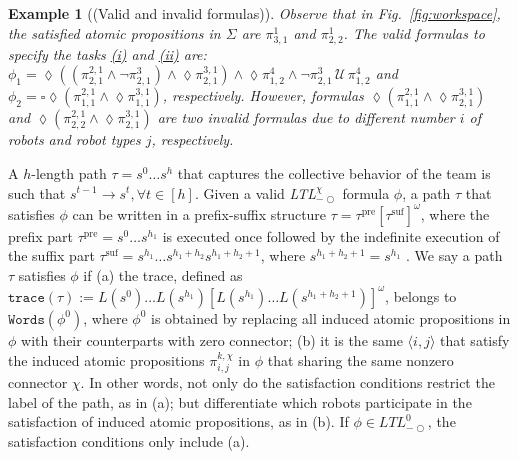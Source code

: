 \documentclass[Afour,sageh,times]{sagej}
\newtheorem{exmp}{Example}
\newcommand{\ltlx}{ {\it LTL}$_{-\bigcirc}^\chi$ }
\newcommand{\ag}[2]{\langle#1,#2\rangle}
\renewcommand{\ap}[3]{\mathcal{\pi}_{{#1},{#2}}^{#3}}
\newenvironment{cexmp}
{\addtocounter{exmp}{-1}\begin{exmp}}
  {\end{exmp}}
\begin{document}
 \begin{cexmp} [(Valid and invalid formulas)]
Observe that in Fig.~\ref{fig:workspace}, the satisfied atomic propositions in $\Sigma$ are $\ap{3}{1}{1}$ and $\ap{2}{2}{1}$.   The valid formulas to specify the tasks \hyperref[task:i]{\it (i)} and \hyperref[task:ii]{\it (ii)} are: $\phi_1 = \lozenge \left(\left(\ap{2}{1}{2,1}\wedge \neg \ap{2}{1}{3}\right) \wedge  \lozenge \ap{2}{1}{3,1}\right)  \wedge \lozenge \ap{1}{2}{4} \wedge \neg \ap{2}{1}{3} \,\mathcal{U}\, \ap{1}{2}{4}$ and $ \phi_2 = \square \lozenge \left(\ap{1}{1}{2,1} \wedge \lozenge \ap{1}{1}{3,1}\right)$, respectively. However, formulas $\lozenge \left(\ap{1}{1}{2,1} \wedge \lozenge \ap{2}{1}{3,1}\right)$ and $\lozenge \left(\ap{2}{2}{2,1} \wedge \lozenge \ap{2}{1}{3,1}\right)$ are two invalid formulas due to different number $i$ of robots and robot types $j$, respectively.
 \end{cexmp}
A $h$-length path $\tau = s^0 \ldots s^h$ that captures the collective behavior of the team is such that $s^{t-1}\to s^{t}, \forall t\in[h]$. Given a valid\ltlx formula $\phi$, a  path $\tau$ that satisfies $\phi$ can be written in a prefix-suffix structure $\tau=\tau^{\text{pre}}[\tau^{\text{suf}}]^\omega$, where the prefix part  $\tau^{\text{pre}}=s^0 \dots s^{h_1}$ is executed once followed by the indefinite execution of the suffix part $\tau^{\text{suf}}=s^{h_1} \dots s^{h_1+h_2} s^{h_1+h_2+1}$, where $s^{h_1+h_2+1}=s^{h_1}$ \citep{baier2008principles}. We say a path $\tau$ satisfies $\phi$ if (a) the trace, defined as $\texttt{trace}(\tau):=L(s^0)\dots L(s^{h_1})[L(s^{h_1})\dots L(s^{h_1+h_2+1})]^{\omega}$,  belongs to $\texttt{Words}(\phi^0)$, where $\phi^0$ is obtained by replacing all induced atomic propositions in $\phi$ with their counterparts with zero connector; (b) it is the same $\ag{i}{j}$ that satisfy the induced atomic propositions $\ap{i}{j}{k,\chi}$ in $\phi$ that sharing the same nonzero connector $\chi$. In other words, not only do the satisfaction conditions restrict the label of the path, as in (a); but differentiate which robots participate in the satisfaction of induced atomic propositions, as in (b). If $\phi \in \textit{LTL}_{-\bigcirc}^0$, the satisfaction conditions only include (a).
\end{document}
